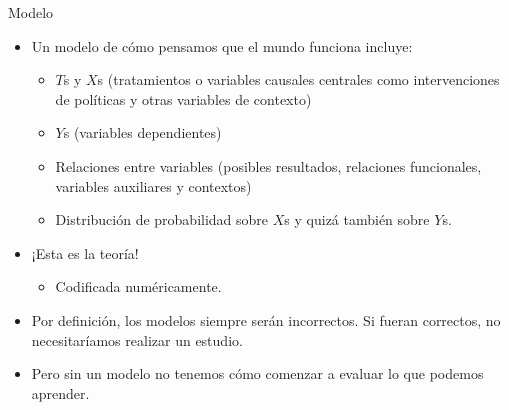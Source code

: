\documentclass[
  ignorenonframetext,
]{beamer}
\providecommand{\tightlist}{%
  \setlength{\itemsep}{0pt}\setlength{\parskip}{0pt}}
\begin{document}
\begin{frame}{Modelo}
\protect\hypertarget{modelo}{}
\begin{itemize}
\item
  Un modelo de cómo pensamos que el mundo funciona incluye:

  \begin{itemize}
  \item
    \(T\)s y \(X\)s (tratamientos o variables causales centrales como
    intervenciones de políticas y otras variables de contexto)
  \item
    \(Y\)s (variables dependientes)
  \item
    Relaciones entre variables (posibles resultados, relaciones
    funcionales, variables auxiliares y contextos)
  \item
    Distribución de probabilidad sobre \(X\)s y quizá también sobre
    \(Y\)s.
  \end{itemize}
\item
  ¡Esta es la teoría!

  \begin{itemize}
  \tightlist
  \item
    Codificada numéricamente.
  \end{itemize}
\item
  Por definición, los modelos siempre serán incorrectos. Si fueran
  correctos, no necesitaríamos realizar un estudio.
\item
  Pero sin un modelo no tenemos cómo comenzar a evaluar lo que podemos
  aprender.
\end{itemize}
\end{frame}
\end{document}
